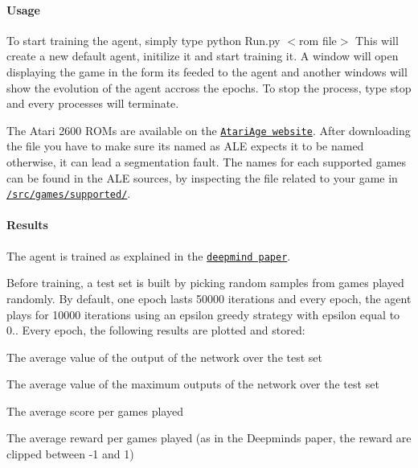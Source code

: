 \paragraph*{Usage}



 To start training the agent, simply type {\ttfamily python Run.\+py $<$rom file$>$} This will create a new default agent, initilize it and start training it. A window will open displaying the game in the form it\textquotesingle{}s feeded to the agent and another windows will show the evolution of the agent accross the epochs. To stop the process, type {\ttfamily stop} and every processes will terminate.

The Atari 2600 R\+O\+Ms are available on the \href{http://www.atariage.com/system_items.html?SystemID=2600&ItemTypeID=ROM}{\tt Atari\+Age website}. After downloading the file you have to make sure its named as A\+LE expects it to be named otherwise, it can lead a segmentation fault. The names for each supported games can be found in the A\+LE sources, by inspecting the file related to your game in \href{https://github.com/mgbellemare/Arcade-Learning-Environment/tree/master/src/games/supported}{\tt /src/games/supported/}. 



\paragraph*{Results}



 The agent is trained as explained in the \href{https://arxiv.org/abs/1312.5602}{\tt deepmind paper}.

Before training, a test set is built by picking random samples from games played randomly. By default, one epoch lasts 50000 iterations and every epoch, the agent plays for 10000 iterations using an epsilon greedy strategy with epsilon equal to 0.. Every epoch, the following results are plotted and stored\+:
\begin{DoxyItemize}
\item The average value of the output of the network over the test set
\item The average value of the maximum outputs of the network over the test set
\item The average score per games played
\item The average reward per games played (as in the Deepmind\textquotesingle{}s paper, the reward are clipped between -\/1 and 1)
\end{DoxyItemize}

